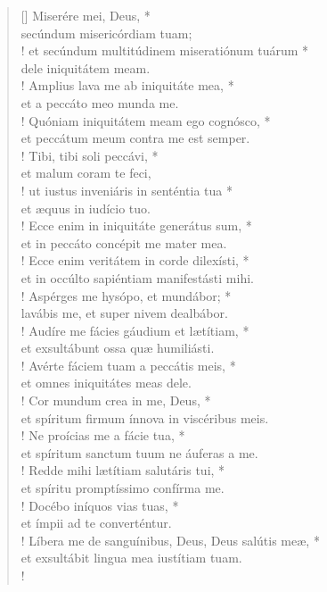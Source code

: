\begin{verse}[\versewidth]
Miserére mei, Deus, *\\
secúndum misericórdiam tuam;\\!
\vin et secúndum multitúdinem miseratiónum tuárum *\\
\vin dele iniquitátem meam.\\!
Amplius lava me ab iniquitáte mea, *\\
et a peccáto meo munda me.\\!
\vin Quóniam iniquitátem meam ego cognósco, *\\
\vin et peccátum meum contra me est semper.\\!
Tibi, tibi soli peccávi, *\\
et malum coram te feci,\\!
\vin ut iustus inveniáris in senténtia tua *\\
\vin et æquus in iudício tuo.\\!
Ecce enim in iniquitáte generátus sum, *\\
et in peccáto concépit me mater mea.\\!
\vin Ecce enim veritátem in corde dilexísti, *\\
\vin et in occúlto sapiéntiam manifestásti mihi.\\!
Aspérges me hysópo, et mundábor; *\\
lavábis me, et super nivem dealbábor.\\!
\vin Audíre me fácies gáudium et lætítiam, *\\
\vin et exsultábunt ossa quæ humiliásti.\\!
Avérte fáciem tuam a peccátis meis, *\\
et omnes iniquitátes meas dele.\\!
\vin Cor mundum crea in me, Deus, *\\
\vin et spíritum firmum ínnova in viscéribus meis.\\!
Ne proícias me a fácie tua, *\\
et spíritum sanctum tuum ne áuferas a me.\\!
\vin Redde mihi lætítiam salutáris tui, *\\
\vin et spíritu promptíssimo confírma me.\\!
Docébo iníquos vias tuas, *\\
et ímpii ad te converténtur.\\!
\vin Líbera me de sanguínibus, Deus, Deus salútis meæ, *\\
\vin et exsultábit lingua mea iustítiam tuam.\\!

\end{verse}
